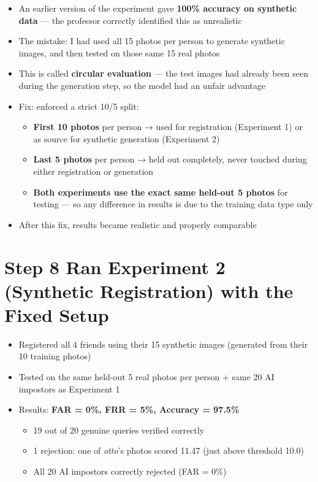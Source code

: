 \documentclass[11pt,a4paper]{article}
\begin{document}
\begin{itemize}
    \item An earlier version of the experiment gave \textbf{100\% accuracy on synthetic data} — the professor correctly identified this as unrealistic
    \item The mistake: I had used all 15 photos per person to generate synthetic images, and then tested on those same 15 real photos
    \item This is called \textbf{circular evaluation} — the test images had already been seen during the generation step, so the model had an unfair advantage
    \item Fix: enforced a strict 10/5 split:
    \begin{itemize}
        \item \textbf{First 10 photos} per person → used for registration (Experiment 1) or as source for synthetic generation (Experiment 2)
        \item \textbf{Last 5 photos} per person → held out completely, never touched during either registration or generation
        \item \textbf{Both experiments use the exact same held-out 5 photos} for testing — so any difference in results is due to the training data type only
    \end{itemize}
    \item After this fix, results became realistic and properly comparable
\end{itemize}

\section*{Step 8 \quad Ran Experiment 2 (Synthetic Registration) with the Fixed Setup}

\begin{itemize}
    \item Registered all 4 friends using their 15 synthetic images (generated from their 10 training photos)
    \item Tested on the same held-out 5 real photos per person + same 20 AI impostors as Experiment 1
    \item Results: \textbf{FAR = 0\%, FRR = 5\%, Accuracy = 97.5\%}
    \begin{itemize}
        \item 19 out of 20 genuine queries verified correctly
        \item 1 rejection: one of \textit{otto}'s photos scored 11.47 (just above threshold 10.0)
        \item All 20 AI impostors correctly rejected (FAR = 0\%)
    \end{itemize}
\end{itemize}
\end{document}
